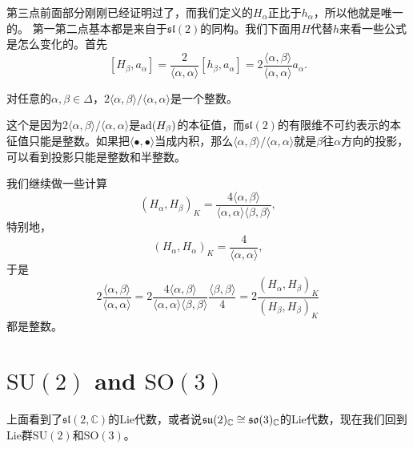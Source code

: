 第三点前面部分刚刚已经证明过了，而我们定义的$H_\alpha$正比于$h_\alpha$，所以他就是唯一的。
第一第二点基本都是来自于$\mathfrak{sl}(2)$的同构。我们下面用$H$代替$h$来看一些公式是怎么变化的。首先
\[
	[H_\beta,a_\alpha]=\frac{2}{\langle \alpha,\alpha \rangle}[h_\beta,a_\alpha]=2\frac{\langle \alpha,\beta \rangle}{\langle \alpha,\alpha \rangle} a_\alpha.
\]

\pro 对任意的$\alpha,\beta\in \Delta$，$2\langle \alpha,\beta \rangle/\langle \alpha,\alpha \rangle$是一个整数。

这个是因为$2\langle \alpha,\beta \rangle/\langle \alpha,\alpha \rangle$是$\operatorname{ad}(H_\beta)$的本征值，而$\mathfrak{sl}(2)$的有限维不可约表示的本征值只能是整数。如果把$\langle \bullet,\bullet \rangle$当成内积，那么$\langle \alpha,\beta \rangle/\langle \alpha,\alpha \rangle$就是$\beta$往$\alpha$方向的投影，可以看到投影只能是整数和半整数。

我们继续做一些计算
\[
(H_\alpha,H_\beta)_K=\frac{4\langle \alpha,\beta \rangle}{\langle \alpha,\alpha \rangle\langle \beta,\beta \rangle},
\]
特别地，
\[
(H_\alpha,H_\alpha)_K=\frac{4}{\langle \alpha,\alpha \rangle},
\]
于是
\[
	2\frac{\langle \alpha,\beta \rangle}{\langle \alpha,\alpha \rangle}=2\frac{4\langle \alpha,\beta \rangle}{\langle \alpha,\alpha \rangle\langle \beta,\beta \rangle}\frac{\langle \beta,\beta \rangle}{4}=2\frac{(H_\alpha,H_\beta)_K}{(H_\beta,H_\beta)_K}
\]
都是整数。

\section{$\mathrm{SU}(2)$ and $\mathrm{SO}(3)$}
上面看到了$\mathfrak{sl}(2,\mathbb{C})$的Lie代数，或者说$\mathfrak{su}(2)_{\mathbb{C}}\cong\mathfrak{so}(3)_{\mathbb{C}}$的Lie代数，现在我们回到Lie群$\mathrm{SU}(2)$和$\mathrm{SO}(3)$。

